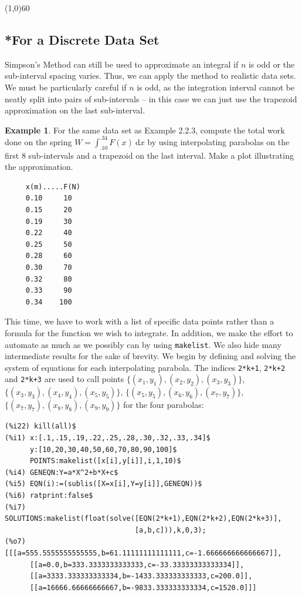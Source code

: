 \documentclass[10.5pt,twoside]{report}
\theoremstyle{definition}
\newtheorem{exmp}{Example}[section]
\begin{document}
\line(1,0){60}
\linethickness{0.5mm}


\subsection{*For a Discrete Data Set}

Simpson's Method can still be used to approximate an integral if $n$ is odd or the sub-interval spacing varies.  Thus, we can apply the method to realistic data sets.  We must be particularly careful if $n$ is odd, as the integration interval cannot be neatly split into pairs of sub-intervals -- in this case we can just use the trapezoid approximation on the last sub-interval.

\begin{exmp} 
For the same data set as Example 2.2.3, compute the total work done on the spring $W=\displaystyle \int_{.10}^{.34} F(x)\ \mathrm{d}x$ by using interpolating parabolas on the first 8 sub-intervals and a trapezoid on the last interval.  Make a plot illustrating the approximation.

\begin{verbatim}
     x(m).....F(N)
     0.10     10
     0.15     20
     0.19     30
     0.22     40
     0.25     50
     0.28     60
     0.30     70
     0.32     80
     0.33     90
     0.34    100
\end{verbatim}

This time, we have to work with a list of specific data points rather than a formula for the function we wish to integrate.  In addition, we make the effort to automate as much as we possibly can by using \verb|makelist|.  We also hide many intermediate results for the sake of brevity.  We begin by defining and solving the system of equations for each interpolating parabola.  The indices \verb|2*k+1|, \verb|2*k+2| and \verb|2*k+3| are used to call points $\lbrace (x_1,y_1),(x_2,y_2),(x_3,y_3) \rbrace$, $\lbrace (x_3,y_3),(x_4,y_4),(x_5,y_5) \rbrace$, $\lbrace (x_5,y_5),(x_6,y_6),(x_7,y_7) \rbrace$, $\lbrace (x_7,y_7),(x_8,y_8),(x_9,y_9) \rbrace$ for the four parabolas:


\begin{verbatim}
(%i22) kill(all)$
(%i1) x:[.1,.15,.19,.22,.25,.28,.30,.32,.33,.34]$
      y:[10,20,30,40,50,60,70,80,90,100]$
      POINTS:makelist([x[i],y[i]],i,1,10)$
(%i4) GENEQN:Y=a*X^2+b*X+c$
(%i5) EQN(i):=(sublis([X=x[i],Y=y[i]],GENEQN))$
(%i6) ratprint:false$
(%i7)  SOLUTIONS:makelist(float(solve([EQN(2*k+1),EQN(2*k+2),EQN(2*k+3)],
                               [a,b,c])),k,0,3);
(%o7) [[[a=555.5555555555555,b=61.11111111111111,c=-1.666666666666667]],
      [[a=0.0,b=333.3333333333333,c=-33.33333333333334]],
      [[a=3333.333333333334,b=-1433.333333333333,c=200.0]],
      [[a=16666.66666666667,b=-9833.333333333334,c=1520.0]]]
\end{verbatim}


\end{exmp}
\end{document}

